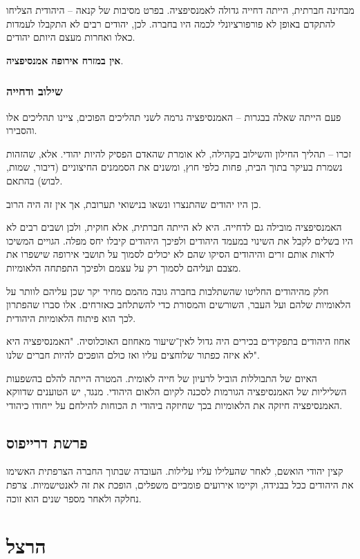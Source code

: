 \documentclass[a4paper]{book}
\begin{document}
	מבחינה חברתית, הייתה דחייה גדולה לאמנסיפציה. בפרט מסיבות של קנאה – היהודית הצליחו להתקדם באופן לא פורפורציונלי לכמה היו בחברה. לכן, יהודים רבים לא התקבלו לעמדות כאלו ואחרות מעצם היותם יהודים. 
	
	\textbf{אין במזרח אירופה אמנסיפציה}.
	
	
	\subsubsection{שילוב ודחייה}
	פעם הייתה שאלה בבגרות – האמנסיפציה גרמה לשני תהליכים הפוכים, ציינו תהליכים אלו והסבירו. 
	
	זכרו – תהליך החילון והשילוב בקהילה, לא אומרת שהאדם הפסיק להיות יהודי. אלא, שהזהות נשמרת בעיקר בתוך הבית, פחות כלפי חוץ, ומשנים את הסממנים החיצוניים (דיבור, שמות, לבוש) בהתאם. 
	
	כן היו יהודים שהתנצרו ונשאו בנישואי תערובת, אך אין זה היה הרוב. 
	
	האמנסיפציה מובילה גם לדחייה. היא לא הייתה חברתית, אלא חוקית, ולכן ושבים רבים לא היו בשלים לקבל את השינוי במעמד היהודים ולפיכך היהודים קיבלו יחס מפלה. הגויים המשיכו לראות אותם זרים והיהודים הסיקו שהם לא יכולים לסמוך על תושבי אירופה שישפרו את מצבם ועליהם לסמוך רק על עצמם ולפיכך התפתחה הלאומיות. 
	
	חלק מהיהודים החליטו שהשתלבות בחברה גובה מהמם מחיר יקר שכן עליהם לוותר על הלאומיות שלהם ועל העבר, השורשים והמסורת כדי להשתלחב כאזרחים. אלו סברו שהפתרון לכך הוא פיתוח הלאומיות היהודית. 
	
	אחוז היהודים בתפקידים בכירים היה גדול לאין־שיעור מאחוזם האוכלוסיה. "האמנסיפציה היא לא איזה כפתור שלוחצים עליו ואז כולם הופכים להיות חברים שלנו". 
	
	האיום של התבוללות הוביל לרעיון של חייה לאומית. המטרה הייתה להלם בהשפעות השליליות של האמנסיפציה הגורמות לסכנה לקיום הלאום היהודי. מנגד, יש הטוענים שדווקא האמנסיפציה חיזקה את הלאומיות בכך שחיזקה ביהודי ת הכוחות להילחם על ייחודו כיהודי. 
	
	\subsection{פרשת דרייפוס}
	קצין יהודי הואשם, לאחר שהעלילו עליו עלילות. העובדה שבתוך החברה הצרפתית האשימו את היהודים ככל בבגידה, וקיימו אירועים פומביים משפלים, הופכת את זה לאנטישמיות. צרפת נחלקה ולאחר מספר שנים הוא זוכה. 
	
	
	\section{הרצל}
	
\end{document}
